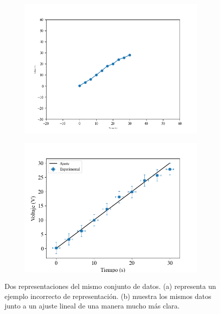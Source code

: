 \documentclass{book}
\begin{document}
\begin{figure}[h]
  
  \begin{adjustwidth}{-3cm}{-4.5cm}
  \centering
  \begin{subfigure}{0.45\pdfpagewidth}
      \centering
      \includegraphics[width=\linewidth]{assets/fig/malagrafica.png}
      \caption{}
      \label{fig:malagraf}
  \end{subfigure}
  \hfill
  \begin{subfigure}{0.45\pdfpagewidth}
      \centering
      \includegraphics[width=\linewidth]{assets/fig/buenagrafica.png}
      \caption{}
      \label{fig:buenagraf}
  \end{subfigure}
  \end{adjustwidth}
  \caption{Dos representaciones del mismo conjunto de datos. (a) representa un
  ejemplo incorrecto de representación. (b) muestra los mismos datos junto a un ajuste lineal
  de una manera mucho más clara.}
  \label{fig:dosgrafs}
  
\end{figure}
\end{document}
